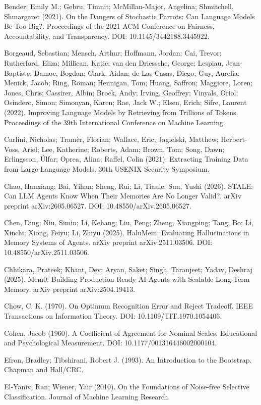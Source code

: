Bender, Emily M.; Gebru, Timnit; McMillan-Major, Angelina; Shmitchell,
Shmargaret (2021). On the Dangers of Stochastic Parrots: Can Language
Models Be Too Big?. Proceedings of the 2021 ACM Conference on Fairness,
Accountability, and Transparency. DOI: 10.1145/3442188.3445922.

Borgeaud, Sebastian; Mensch, Arthur; Hoffmann, Jordan; Cai, Trevor;
Rutherford, Eliza; Millican, Katie; van den Driessche, George; Lespiau,
Jean-Baptiste; Damoc, Bogdan; Clark, Aidan; de Las Casas, Diego; Guy,
Aurelia; Menick, Jacob; Ring, Roman; Hennigan, Tom; Huang, Saffron;
Maggiore, Loren; Jones, Chris; Cassirer, Albin; Brock, Andy; Irving,
Geoffrey; Vinyals, Oriol; Osindero, Simon; Simonyan, Karen; Rae, Jack
W.; Elsen, Erich; Sifre, Laurent (2022). Improving Language Models by
Retrieving from Trillions of Tokens. Proceedings of the 39th
International Conference on Machine Learning.

Carlini, Nicholas; Tramèr, Florian; Wallace, Eric; Jagielski, Matthew;
Herbert-Voss, Ariel; Lee, Katherine; Roberts, Adam; Brown, Tom; Song,
Dawn; Erlingsson, Úlfar; Oprea, Alina; Raffel, Colin (2021). Extracting
Training Data from Large Language Models. 30th USENIX Security
Symposium.

Chao, Hanxiang; Bai, Yihan; Sheng, Rui; Li, Tianle; Sun, Yushi (2026).
STALE: Can LLM Agents Know When Their Memories Are No Longer Valid?.
arXiv preprint arXiv:2605.06527. DOI: 10.48550/arXiv.2605.06527.

Chen, Ding; Niu, Simin; Li, Kehang; Liu, Peng; Zheng, Xiangping; Tang,
Bo; Li, Xinchi; Xiong, Feiyu; Li, Zhiyu (2025). HaluMem: Evaluating
Hallucinations in Memory Systems of Agents. arXiv preprint
arXiv:2511.03506. DOI: 10.48550/arXiv.2511.03506.

Chhikara, Prateek; Khant, Dev; Aryan, Saket; Singh, Taranjeet; Yadav,
Deshraj (2025). Mem0: Building Production-Ready AI Agents with Scalable
Long-Term Memory. arXiv preprint arXiv:2504.19413.

Chow, C. K. (1970). On Optimum Recognition Error and Reject Tradeoff.
IEEE Transactions on Information Theory. DOI: 10.1109/TIT.1970.1054406.

Cohen, Jacob (1960). A Coefficient of Agreement for Nominal Scales.
Educational and Psychological Measurement. DOI:
10.1177/001316446002000104.

Efron, Bradley; Tibshirani, Robert J. (1993). An Introduction to the
Bootstrap. Chapman and Hall/CRC.

El-Yaniv, Ran; Wiener, Yair (2010). On the Foundations of Noise-free
Selective Classification. Journal of Machine Learning Research.

